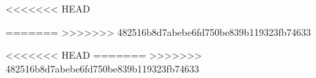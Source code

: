 
<<<<<<< HEAD
\newcommand{\myAutor}{Florian Lorisch, Leon Schlote, Michael Schwabe, Florian Schwanz} %


=======
\newcommand{\myAutor}{Florian Lorisch, Leon Schlote, Michael Schwabe, Florian Schwanz}
>>>>>>> 482516b8d7abebe6fd750be839b119323fb74633

\newcommand{\myAdresse}{Heidestra\ss e 17 \\ \> \> \> 51147 Köln}

\newcommand{\myTitel}{Berlin Mobility - Verkehrsanalyse im Raum Berlin}

\newcommand{\myBetreuer}{Luigi Gino Liguori}

\newcommand{\myLehrveranstaltung}{Big-Data-Consultingprojekt}

<<<<<<< HEAD
\newcommand{\myMatrikelNr}{504870, 517829, 519054, 509150}  %
=======
\newcommand{\myMatrikelNr}{504870, 517829, 519054, 509150}
>>>>>>> 482516b8d7abebe6fd750be839b119323fb74633

\newcommand{\myOrt}{Berlin}

\newcommand{\myAbgabeDatum}{\today}

\newcommand{\mySemesterZahl}{4}

\newcommand{\myHochschulName}{FOM Hochschule für Oekonomie \& Management}

\newcommand{\myHochschulStandort}{Berlin}

\newcommand{\myStudiengang}{Big Data \& Business Analytics (M.Sc.)}

\newcommand{\myThesisArt}{Projektarbeit}

\newcommand{\myAkademischerGrad}{Bachelor of Science (B.Sc.)}

\newcommand{\myFirma}{Mustermann GmbH}


\ifdefined\FOMEN
\entrue
\usepackage[english]{babel}
\else
\detrue
\usepackage[ngerman]{babel}
\fi
